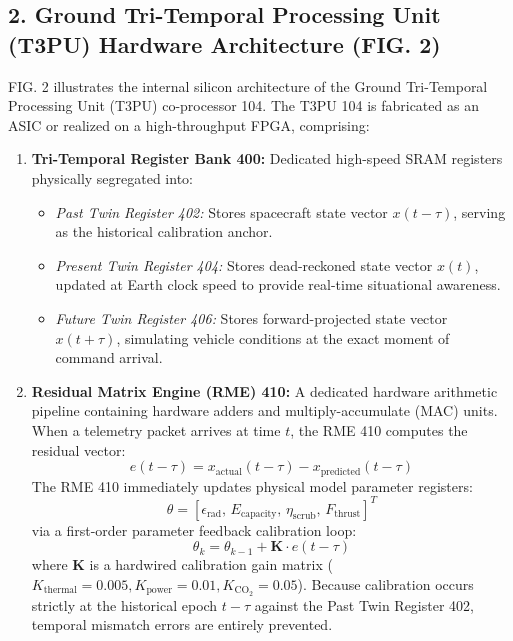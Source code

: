 \documentclass[12pt,a4paper]{article}
\begin{document}
\subsection*{2. Ground Tri-Temporal Processing Unit (T3PU) Hardware Architecture (FIG. 2)}
FIG. 2 illustrates the internal silicon architecture of the Ground Tri-Temporal Processing Unit (T3PU) co-processor 104. The T3PU 104 is fabricated as an ASIC or realized on a high-throughput FPGA, comprising:
\begin{enumerate}
    \item \textbf{Tri-Temporal Register Bank 400:} Dedicated high-speed SRAM registers physically segregated into:
    \begin{itemize}
        \item \textit{Past Twin Register 402:} Stores spacecraft state vector $x(t-\tau)$, serving as the historical calibration anchor.
        \item \textit{Present Twin Register 404:} Stores dead-reckoned state vector $x(t)$, updated at Earth clock speed to provide real-time situational awareness.
        \item \textit{Future Twin Register 406:} Stores forward-projected state vector $x(t+\tau)$, simulating vehicle conditions at the exact moment of command arrival.
    \end{itemize}
    
    \item \textbf{Residual Matrix Engine (RME) 410:} A dedicated hardware arithmetic pipeline containing hardware adders and multiply-accumulate (MAC) units. When a telemetry packet arrives at time $t$, the RME 410 computes the residual vector:
    \begin{equation}
        e(t-\tau) = x_{\text{actual}}(t-\tau) - x_{\text{predicted}}(t-\tau)
    \end{equation}
    The RME 410 immediately updates physical model parameter registers:
    \begin{equation}
        \theta = \left[\epsilon_{\text{rad}},\, E_{\text{capacity}},\, \eta_{\text{scrub}},\, F_{\text{thrust}}\right]^T
    \end{equation}
    via a first-order parameter feedback calibration loop:
    \begin{equation}
        \theta_k = \theta_{k-1} + \mathbf{K} \cdot e(t-\tau)
    \end{equation}
    where $\mathbf{K}$ is a hardwired calibration gain matrix ($K_{\text{thermal}} = 0.005, K_{\text{power}} = 0.01, K_{\text{CO}_2} = 0.05$). Because calibration occurs strictly at the historical epoch $t-\tau$ against the Past Twin Register 402, temporal mismatch errors are entirely prevented.
    

\end{enumerate}
\end{document}
